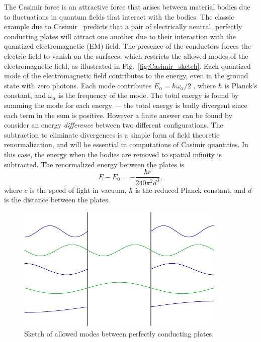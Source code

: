 The Casimir force is an attractive force that arises between material bodies due to fluctuations in quantum fields
that interact with the bodies.
The classic example due to Casimir~\cite{Casimir1948} predicts that a pair of electrically neutral,
perfectly conducting plates will attract one another due to their interaction with the quantized 
electromagnetic (EM) field.  
The presence of the conductors forces the electric field to vanish on the surfaces,
which restricts the allowed modes of the electromagnetic field, as illustrated in Fig.~\ref{fig:Casimir_sketch}.
Each quantized mode of the electromagnetic field contributes
to the energy, even in the ground state with zero photons.  Each mode contributes 
$E_\alpha=\hbar\omega_\alpha/2$ , where $\hbar$ is Planck's  constant, and $\omega_\alpha$ is the frequency of the mode.
The total energy is found by summing the mode for each energy --- the total energy is
badly divergent since each term in the sum is positive.  However a finite answer can 
be found by consider an energy \emph{difference} between two different configurations.  
The subtraction to eliminate divergences is a simple form of field theoretic renormalization, 
and will be essential in computations of Casimir quantities.  
In this case, the energy when the bodies are removed to spatial infinity is subtracted.  
  The renormalized energy between the plates is
\begin{equation}
  E-E_0 = -\frac{\hbar c}{240\pi^2 d^3},
\end{equation}
where $c$ is the speed of light in vacuum, $\hbar$ is the reduced Planck constant,
and $d$ is the distance between the plates.  
\begin{figure}
\center
\includegraphics[width=10cm]{fig/intro/twoplanes_wave}
\caption{Sketch of allowed modes between perfectly conducting plates.}
\label{fig:Casimir_plates}
\end{figure}


